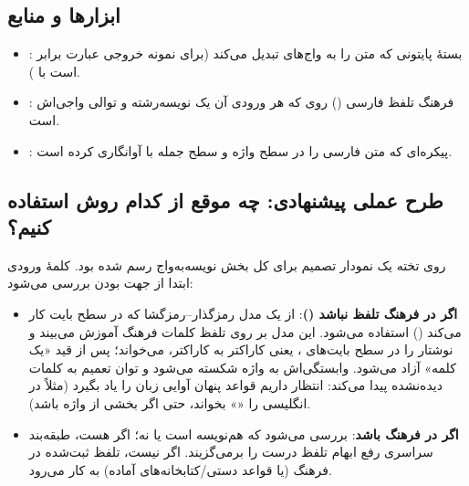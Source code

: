 \subsection{ابزارها و منابع}
\begin{itemize}
  \item {}: بستهٔ پایتونی که متن را به واج‌های  تبدیل می‌کند (برای نمونه خروجی عبارت  برابر است با ).
  \item {}: فرهنگ تلفظ فارسی () روی  که هر ورودی آن یک نویسه‌رشته و توالی واجی‌اش است.
  \item {}: پیکره‌ای که متن فارسی را در سطح واژه و سطح جمله با  آوانگاری کرده است.
\end{itemize}


\label{fig:ch07-kaameldict}


\subsection{طرح عملی پیشنهادی: چه موقع از کدام روش استفاده کنیم؟}
روی تخته یک نمودار تصمیم برای کل بخش نویسه‌به‌واج رسم شده بود. کلمهٔ ورودی ابتدا از جهت  بودن بررسی می‌شود:
\begin{itemize}
  \item \textbf{اگر در فرهنگ تلفظ نباشد ()}: از یک مدل رمزگذار–رمزگشا که در سطح بایت کار می‌کند () استفاده می‌شود. این مدل بر روی تلفظ کلمات فرهنگ آموزش می‌بیند و نوشتار را در سطح بایت‌های ، یعنی کاراکتر به کاراکتر، می‌خواند؛ پس از قید «یک کلمه» آزاد می‌شود. وابستگی‌اش به واژه شکسته می‌شود و توان تعمیم به کلمات دیده‌نشده پیدا می‌کند: انتظار داریم قواعد پنهان آوایی زبان را یاد بگیرد (مثلاً در انگلیسی  را «» بخواند، حتی اگر بخشی از واژه  باشد).
  \item \textbf{اگر در فرهنگ باشد}: بررسی می‌شود که هم‌نویسه است یا نه؛ اگر هست، طبقه‌بند سراسری رفع ابهام تلفظ درست را برمی‌گزیند. اگر نیست، تلفظ ثبت‌شده در فرهنگ (یا قواعد دستی/کتابخانه‌های آماده) به کار می‌رود.
\end{itemize}

